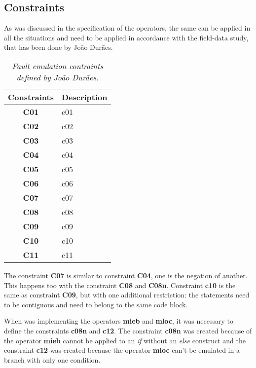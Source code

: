 \subsection{Constraints}

As was discussed in the specification of the operators, the same can be applied in all the situations and need to be applied in accordance with the field-data study, that has been done by João Durães.

\begin{table}[!ht]
\centering
\begin{tabular}{|c|p{12cm}|}
\hline
\textbf{Constraints}            & \multicolumn{1}{c|}{\textbf{Description}}                                     \\ \hline \hline
\textbf{C01}         & \Acl{c01} \\ \hline
\textbf{C02}         & \Acl{c02} \\ \hline
\textbf{C03}         & \Acl{c03} \\ \hline
\textbf{C04}         & \Acl{c04} \\ \hline
\textbf{C05}         & \Acl{c05} \\ \hline
\textbf{C06}         & \Acl{c06} \\ \hline
\textbf{C07}         & \Acl{c07} \\ \hline
\textbf{C08}         & \Acl{c08} \\ \hline
\textbf{C09}         & \Acl{c09} \\ \hline
\textbf{C10}         & \Acl{c10} \\ \hline
\textbf{C11}         & \Acl{c11} \\ \hline
\end{tabular}
\caption{\small \sl Fault emulation contraints defined by João Durães.\label{tab:faultEmulationConstraintsDuraes}}
\end{table}

The constraint \textbf{C07} is similar to constraint \textbf{C04}, one is the negation of another. This happens too with the constraint \textbf{C08} and \textbf{C08n}.
Constraint \textbf{c10} is the same as constraint \textbf{C09}, but with one additional restriction: the statements need to be contiguous and need to belong to the same code block.

When was implementing the operators \textbf{\ac{mieb}} and \textbf{\ac{mloc}}, it was necessary to define the constraints \textbf{\ac{c08n}} and \textbf{\ac{c12}}. The constraint \textbf{\ac{c08n}} was created because of the operator \textbf{\ac{mieb}} cannot be applied to an \textit{if} without an \textit{else} construct and the constraint \textbf{\ac{c12}} was created because the operator \textbf{\ac{mloc}} can't be emulated in a branch with only one condition.

